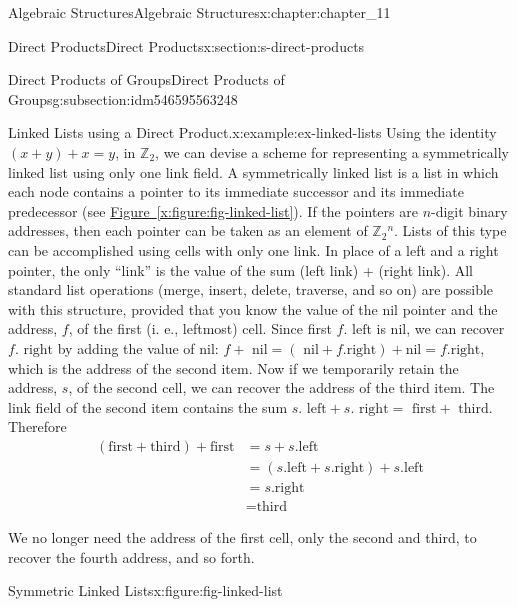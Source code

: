 \documentclass[oneside,10pt,]{book}
\newcommand{\xreffont}{\relax}
\numberwithin{equation}{section}
\begin{document}
\begin{chapterptx}{Algebraic Structures}{}{Algebraic Structures}{}{}{x:chapter:chapter_11}
\begin{sectionptx}{Direct Products}{}{Direct Products}{}{}{x:section:s-direct-products}
\begin{subsectionptx}{Direct Products of Groups}{}{Direct Products of Groups}{}{}{g:subsection:idm546595563248}
\begin{example}{Linked Lists using a Direct Product.}{x:example:ex-linked-lists}
Using the identity \((x + y) + x = y\), in \(\mathbb{Z}_2\), we can devise a scheme for representing a symmetrically linked list using only one link field. A symmetrically linked list is a list in which each node contains a pointer to its immediate successor and its immediate predecessor (see \hyperref[x:figure:fig-linked-list]{Figure~{\xreffont\ref{x:figure:fig-linked-list}}}). If the pointers are \(n\)-digit binary addresses, then each pointer can be taken as an element of \(\mathbb{Z}_2{}^n\).  Lists of this type can be accomplished using cells with only one link.  In place of a left and a right pointer, the only ``link'' is the value  of the sum (left link) + (right link). All standard list operations (merge, insert, delete, traverse, and so on) are possible with this structure, provided that you know the value of the nil pointer and the address, \(f\), of the first (i. e., leftmost) cell. Since first \(f.\textrm{ left}\) is nil, we can recover \(f.\textrm{ right}\) by adding the value of nil: \(f + \textrm{ nil} = (\textrm{ nil} + f.\textrm{right}) + \textrm{nil} = f.\textrm{right}\), which is the address of the second item. Now if we temporarily retain the address, \(s\),  of the second cell, we can recover the address of the third item. The link field of the second item contains the sum \(s.\textrm{ left} + s.\textrm{ right} = \textrm{ first} + \textrm{ third}\).  Therefore%
\begin{equation*}
\begin{split}
(\textrm{first} + \textrm{third})+ \textrm{first} &= s + s.\textrm{left}\\
&=( s.\textrm{left} + s.\textrm{right})+ s.\textrm{left}\\
&=s.\textrm{right}\\
&= \textrm{third}
\end{split}
\end{equation*}
%
\par
We no longer need the address of the first cell, only the second and third, to recover the fourth address, and so forth.%
\begin{figureptx}{Symmetric Linked Lists}{x:figure:fig-linked-list}{}%
\begin{image}{0.15}{0.7}{0.15}%

\end{image}
\end{figureptx}
\end{example}
\end{subsectionptx}
\end{sectionptx}
\end{chapterptx}
\end{document}
